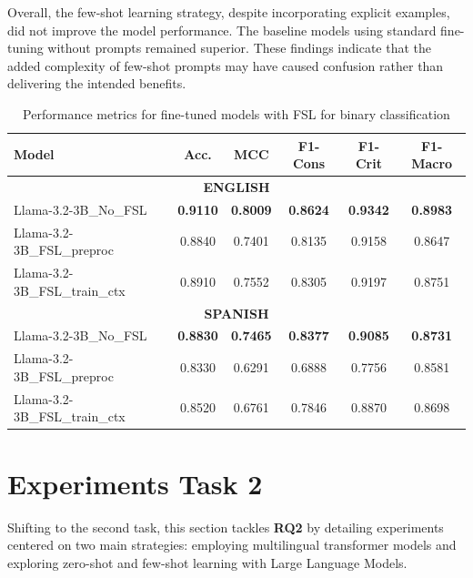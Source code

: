 \documentclass{Configuration_Files/PoliMi3i_thesis}
\begin{document}
Overall, the few-shot learning strategy, despite incorporating explicit examples, did not improve the model performance. The baseline models using standard fine-tuning without prompts remained superior. These findings indicate that the added complexity of few-shot prompts may have caused confusion rather than delivering the intended benefits.


\begin{table}[H]
    \centering
    \small
    \begin{tabular}{lccccc}
        \hline
        \textbf{Model} & \textbf{Acc.} & \textbf{MCC} & \textbf{F1-Cons} & \textbf{F1-Crit} & \textbf{F1-Macro}\\
        \hline
        \multicolumn{6}{c}{\textbf{ENGLISH}} \\
        \hline
        Llama-3.2-3B\_No\_FSL & \textbf{0.9110} & \textbf{0.8009} & \textbf{0.8624} & \textbf{0.9342} & \textbf{0.8983} \\
        Llama-3.2-3B\_FSL\_preproc & 0.8840 & 0.7401 & 0.8135 & 0.9158 & 0.8647  \\
        Llama-3.2-3B\_FSL\_train\_ctx & 0.8910 & 0.7552 & 0.8305 & 0.9197 & 0.8751 \\ 
        \hline 
        \multicolumn{6}{c}{\textbf{SPANISH}} \\
        \hline
        Llama-3.2-3B\_No\_FSL & \textbf{0.8830} & \textbf{0.7465} & \textbf{0.8377} & \textbf{0.9085} & \textbf{0.8731} \\ 
        Llama-3.2-3B\_FSL\_preproc & 0.8330 & 0.6291 & 0.6888 & 0.7756 & 0.8581  \\ 
        Llama-3.2-3B\_FSL\_train\_ctx & 0.8520 & 0.6761 & 0.7846 & 0.8870 & 0.8698  \\ 
        \hline 
    \end{tabular}
    \caption{Performance metrics for fine-tuned models with FSL for binary classification}
    \label{tab:performance_ft_with_ZSL_FSL}
\end{table}
\FloatBarrier


\section{Experiments Task 2}
Shifting to the second task, this section tackles \textbf{RQ2} by detailing experiments centered on two main strategies: employing multilingual transformer models and exploring zero-shot and few-shot learning with Large Language Models.
\end{document}
